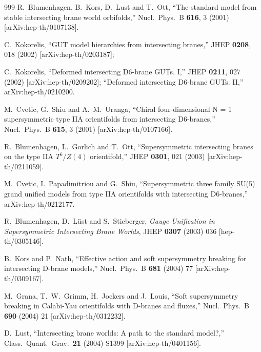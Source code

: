 \begin{thebibliography}{999}
R.~Blumenhagen, B.~Kors, D.~Lust and T.~Ott,
``The standard model from stable intersecting brane world orbifolds,''
Nucl.\ Phys.\ B {\bf 616}, 3 (2001)
[arXiv:hep-th/0107138].

C.~Kokorelis,
``GUT model hierarchies from intersecting branes,''
JHEP {\bf 0208}, 018 (2002)
[arXiv:hep-th/0203187];

C.~Kokorelis,
``Deformed intersecting D6-brane GUTs. I,''
JHEP {\bf 0211}, 027 (2002)
[arXiv:hep-th/0209202];
``Deformed intersecting D6-brane GUTs. II,''
arXiv:hep-th/0210200.

M.~Cvetic, G.~Shiu and A.~M.~Uranga,
``Chiral four-dimensional N = 1 supersymmetric type IIA orientifolds from  intersecting D6-branes,''
Nucl.\ Phys.\ B {\bf 615}, 3 (2001)
[arXiv:hep-th/0107166].

R.~Blumenhagen, L.~Gorlich and T.~Ott,
``Supersymmetric intersecting branes on the type IIA $T^6/Z(4)$  orientifold,''
JHEP {\bf 0301}, 021 (2003)
[arXiv:hep-th/0211059].

M.~Cvetic, I.~Papadimitriou and G.~Shiu,
``Supersymmetric three family SU(5) grand unified models from type IIA  orientifolds with intersecting D6-branes,''
arXiv:hep-th/0212177.

R.~Blumenhagen, D.~L\"ust and S.~Stieberger,
{\it Gauge Unification in Supersymmetric Intersecting Brane Worlds},
JHEP {\bf 0307} (2003) 036
[hep-th/0305146].

  B.~Kors and P.~Nath,
  ``Effective action and soft supersymmetry breaking for intersecting  D-brane
  models,''
  Nucl.\ Phys.\ B {\bf 681} (2004) 77
  [arXiv:hep-th/0309167].

  M.~Grana, T.~W.~Grimm, H.~Jockers and J.~Louis,
  ``Soft supersymmetry breaking in Calabi-Yau orientifolds with D-branes  and
  fluxes,''
  Nucl.\ Phys.\ B {\bf 690} (2004) 21
  [arXiv:hep-th/0312232].

  D.~Lust,
  ``Intersecting brane worlds: A path to the standard model?,''
  Class.\ Quant.\ Grav.\  {\bf 21} (2004) S1399
  [arXiv:hep-th/0401156].


\end{thebibliography}
